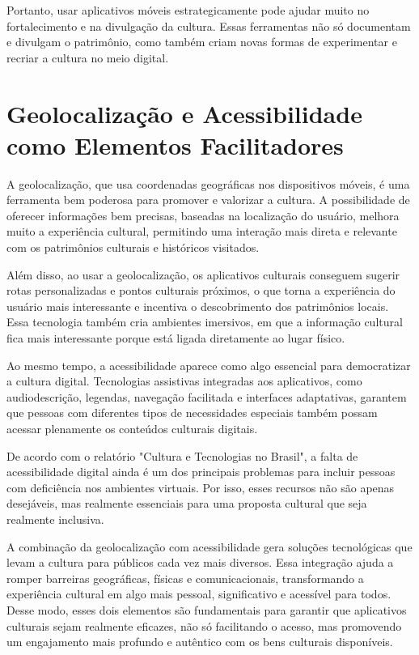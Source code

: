 Portanto, usar aplicativos móveis estrategicamente pode ajudar muito no fortalecimento e na divulgação da cultura. Essas ferramentas não só documentam e divulgam o patrimônio, como também criam novas formas de experimentar e recriar a cultura no meio digital.

 
\section{Geolocalização e Acessibilidade como Elementos Facilitadores} 

A geolocalização, que usa coordenadas geográficas nos dispositivos móveis, é uma ferramenta bem poderosa para promover e valorizar a cultura. A possibilidade de oferecer informações bem precisas, baseadas na localização do usuário, melhora muito a experiência cultural, permitindo uma interação mais direta e relevante com os patrimônios culturais e históricos visitados. \cite{soster2021tecnologias}

Além disso, ao usar a geolocalização, os aplicativos culturais conseguem sugerir rotas personalizadas e pontos culturais próximos, o que torna a experiência do usuário mais interessante e incentiva o descobrimento dos patrimônios locais. Essa tecnologia também cria ambientes imersivos, em que a informação cultural fica mais interessante porque está ligada diretamente ao lugar físico. \cite{oliveira-cultura-tecnologias-ufse}

Ao mesmo tempo, a acessibilidade aparece como algo essencial para democratizar a cultura digital. Tecnologias assistivas integradas aos aplicativos, como audiodescrição, legendas, navegação facilitada e interfaces adaptativas, garantem que pessoas com diferentes tipos de necessidades especiais também possam acessar plenamente os conteúdos culturais digitais. \cite{soster2021tecnologias}

De acordo com o relatório "Cultura e Tecnologias no Brasil", a falta de acessibilidade digital ainda é um dos principais problemas para incluir pessoas com deficiência nos ambientes virtuais. Por isso, esses recursos não são apenas desejáveis, mas realmente essenciais para uma proposta cultural que seja realmente inclusiva. \cite{nic-cultura-tecnologias-no-brasil}

A combinação da geolocalização com acessibilidade gera soluções tecnológicas que levam a cultura para públicos cada vez mais diversos. Essa integração ajuda a romper barreiras geográficas, físicas e comunicacionais, transformando a experiência cultural em algo mais pessoal, significativo e acessível para todos. Desse modo, esses dois elementos são fundamentais para garantir que aplicativos culturais sejam realmente eficazes, não só facilitando o acesso, mas promovendo um engajamento mais profundo e autêntico com os bens culturais disponíveis.


